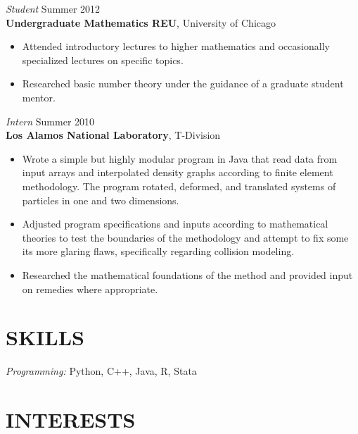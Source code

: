 \documentclass[margin, 10pt]{res} %
\begin{document}
\begin{resume}
{\sl Student} \hfill Summer 2012 \\
\textbf{Undergraduate Mathematics REU}, University of Chicago 
\begin{itemize} 
\item Attended introductory lectures to higher mathematics and occasionally specialized lectures on specific topics.
\item Researched basic number theory under the guidance of a graduate student mentor.  
\end{itemize} 

{\sl Intern} \hfill Summer 2010 \\
\textbf{Los Alamos National Laboratory}, T-Division
\begin{itemize}
\item Wrote a simple but highly modular program in Java that read data from input arrays and interpolated density graphs according to finite element methodology. The program rotated, deformed, and translated systems of particles in one and two dimensions.
\item Adjusted program specifications and inputs according to mathematical theories to test the boundaries of the methodology and attempt to fix some its more glaring flaws, specifically regarding collision modeling. 
\item Researched the mathematical foundations of the method and provided input on remedies where appropriate. 
\end{itemize} 


\section{SKILLS} 

{\sl Programming:} 
Python, C++, Java, R, Stata \\


\section{INTERESTS} 


\end{resume}
\end{document}
